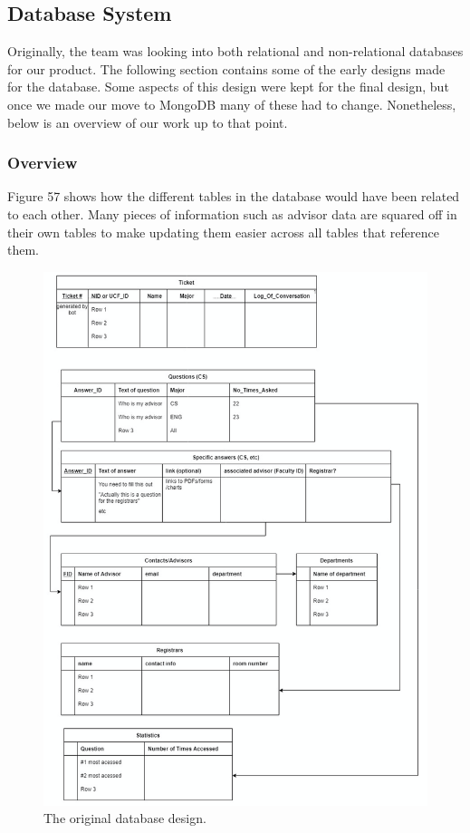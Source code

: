 \documentclass[titlepage, 12pt]{article}
\begin{document}
\subsection{Database System}

Originally, the team was looking into both relational and non-relational databases for our product. The following section contains some of the early designs made for the database. Some aspects of this design were kept for the final design, but once we made our move to MongoDB many of these had to change. Nonetheless, below is an overview of our work up to that point.

\subsubsection{Overview}

Figure 57 shows how the different tables in the database would have been related to each other. Many pieces of information such as advisor data are squared off in their own tables to make updating them easier across all tables that reference them.

\begin{figure}[p]
    \centering\includegraphics[width=1\linewidth]{images/original-database.png}
    \caption{The original database design.}
\end{figure}
\end{document}
